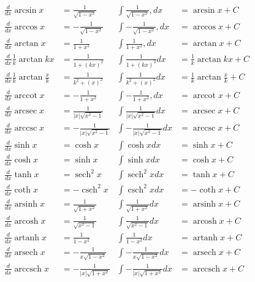 \documentclass{article}
\begin{document}
\begin{multicols}{2}
\begin{align*}
\frac{d}{dx}\arcsin x &= \frac{1}{\sqrt{1-x^2}}
&\int \frac{1}{\sqrt{1-x^2}},dx &= \arcsin x + C
\\[6pt]
\frac{d}{dx}\arccos x &= -\frac{1}{\sqrt{1-x^2}}
&\int -\frac{1}{\sqrt{1-x^2}},dx &= \arccos x + C
\\[6pt]
\frac{d}{dx}\arctan x &= \frac{1}{1+x^2}
&\int \frac{1}{1+x^2},dx &= \arctan x + C
\\[6pt]
\frac{d}{dx}\frac{1}{k}\arctan kx &= \frac{1}{1+(kx)^2}
&\int \frac{1}{1+(kx)^2}dx &= \frac{1}{k}\arctan kx + C
\\[6pt]
\frac{d}{dx}\frac{1}{k}\arctan \frac{x}{k} &= \frac{1}{k^2+(x)^2}
&\int \frac{1}{k^2+(x)^2}dx &= \frac{1}{k}\arctan \frac{x}{k} + C
\\[6pt]
\frac{d}{dx}\operatorname{arccot} x &= -\frac{1}{1+x^2}
&\int -\frac{1}{1+x^2},dx &= \operatorname{arccot} x + C
\\[6pt]
\frac{d}{dx}\operatorname{arcsec} x &= \frac{1}{|x|\sqrt{x^2-1}}
&\int \frac{1}{|x|\sqrt{x^2-1}}dx &= \operatorname{arcsec} x + C
\\[6pt]
\frac{d}{dx}\operatorname{arccsc} x &= -\frac{1}{|x|\sqrt{x^2-1}}
&\int -\frac{1}{|x|\sqrt{x^2-1}}dx &= \operatorname{arccsc} x + C
\\[10pt]
\frac{d}{dx}\sinh x &= \cosh x
&\int \cosh xdx &= \sinh x + C
\\[6pt]
\frac{d}{dx}\cosh x &= \sinh x
&\int \sinh xdx &= \cosh x + C
\\[6pt]
\frac{d}{dx}\tanh x &= \operatorname{sech}^2 x
&\int \operatorname{sech}^2 xdx &= \tanh x + C
\\[6pt]
\frac{d}{dx}\coth x &= -\operatorname{csch}^2 x
&\int \operatorname{csch}^2 xdx &= -\coth x + C
\\[6pt]
\frac{d}{dx}\operatorname{arsinh} x &= \frac{1}{\sqrt{1+x^2}}
&\int \frac{1}{\sqrt{1+x^2}}dx &= \operatorname{arsinh} x + C
\\[6pt]
\frac{d}{dx}\operatorname{arcosh} x &= \frac{1}{\sqrt{x^2-1}}
&\int \frac{1}{\sqrt{x^2-1}}dx &= \operatorname{arcosh} x + C
\\[6pt]
\frac{d}{dx}\operatorname{artanh} x &= \frac{1}{1 - x^2}
&\int \frac{1}{1 - x^2}dx &= \operatorname{artanh} x + C
\\[6pt]
\frac{d}{dx}\operatorname{arsech} x &= -\frac{1}{x\sqrt{1 - x^2}}
&\int -\frac{1}{x\sqrt{1 - x^2}}dx &= \operatorname{arsech} x + C
\\[6pt]
\frac{d}{dx}\operatorname{arccsch} x &= -\frac{1}{|x|\sqrt{1 + x^2}}
&\int -\frac{1}{|x|\sqrt{1 + x^2}}dx &= \operatorname{arccsch} x + C
\end{align*}

\end{multicols}
\end{document}
